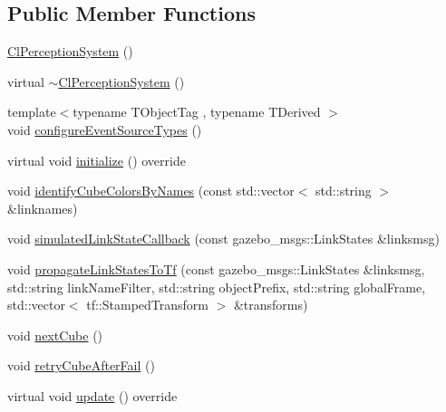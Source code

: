 \subsection*{Public Member Functions}
\begin{DoxyCompactItemize}
\item 
\hyperlink{classsm__moveit__4_1_1cl__perception__system_1_1ClPerceptionSystem_aeb969985d995c4ba91f1f2f693fe2c3a}{Cl\+Perception\+System} ()
\item 
virtual \hyperlink{classsm__moveit__4_1_1cl__perception__system_1_1ClPerceptionSystem_aa914df8a54f247c92cb0e7c3568b9e44}{$\sim$\+Cl\+Perception\+System} ()
\item 
{\footnotesize template$<$typename T\+Object\+Tag , typename T\+Derived $>$ }\\void \hyperlink{classsm__moveit__4_1_1cl__perception__system_1_1ClPerceptionSystem_a693927b659a3f739f2bc2ac403df0f1a}{configure\+Event\+Source\+Types} ()
\item 
virtual void \hyperlink{classsm__moveit__4_1_1cl__perception__system_1_1ClPerceptionSystem_a26ae80fff022baeccb4ca81537cefd53}{initialize} () override
\item 
void \hyperlink{classsm__moveit__4_1_1cl__perception__system_1_1ClPerceptionSystem_a31de68bff6b7e96df405b04b421d957f}{identify\+Cube\+Colors\+By\+Names} (const std\+::vector$<$ std\+::string $>$ \&linknames)
\item 
void \hyperlink{classsm__moveit__4_1_1cl__perception__system_1_1ClPerceptionSystem_a345284941e550bc24c90001351a25087}{simulated\+Link\+State\+Callback} (const gazebo\+\_\+msgs\+::\+Link\+States \&linksmsg)
\item 
void \hyperlink{classsm__moveit__4_1_1cl__perception__system_1_1ClPerceptionSystem_a9e19707fd890d6503ac417d8c89ba4d9}{propagate\+Link\+States\+To\+Tf} (const gazebo\+\_\+msgs\+::\+Link\+States \&linksmsg, std\+::string link\+Name\+Filter, std\+::string object\+Prefix, std\+::string global\+Frame, std\+::vector$<$ tf\+::\+Stamped\+Transform $>$ \&transforms)
\item 
void \hyperlink{classsm__moveit__4_1_1cl__perception__system_1_1ClPerceptionSystem_adb892199c1e7eb48d41e501a2b0ec5e8}{next\+Cube} ()
\item 
void \hyperlink{classsm__moveit__4_1_1cl__perception__system_1_1ClPerceptionSystem_a060df4809e44b378878819c884e86fb8}{retry\+Cube\+After\+Fail} ()
\item 
virtual void \hyperlink{classsm__moveit__4_1_1cl__perception__system_1_1ClPerceptionSystem_a91de8cf71c93738f8bcbea388c84a5dd}{update} () override

\end{DoxyCompactItemize}
